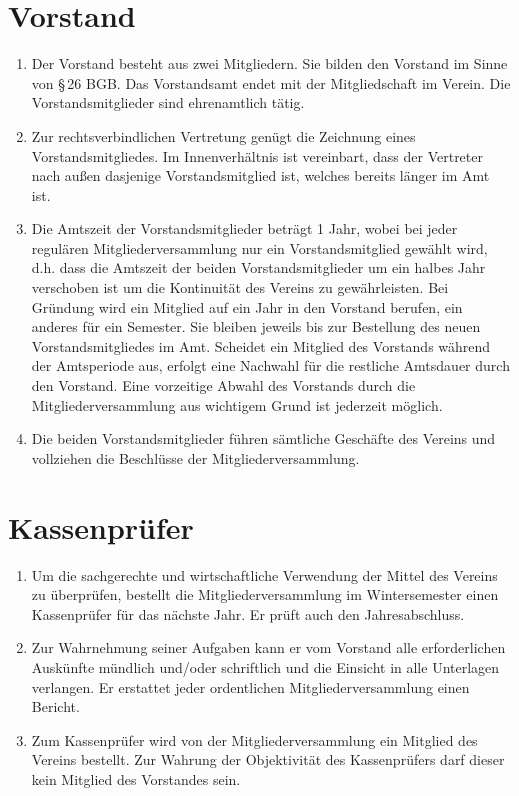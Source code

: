 \documentclass{article}
\begin{document}
\section{Vorstand}
\label{sec:vorstand}
\begin{enumerate}
	\item Der Vorstand besteht aus zwei Mitgliedern. Sie bilden den Vorstand im Sinne von \S\,26 BGB. Das Vorstandsamt endet mit der Mitgliedschaft im Verein. Die Vorstandsmitglieder sind ehrenamtlich tätig.
	\item Zur rechtsverbindlichen Vertretung genügt die Zeichnung eines Vorstandsmitgliedes. Im Innenverhältnis ist vereinbart, dass der Vertreter nach außen dasjenige Vorstandsmitglied ist, welches bereits länger im Amt ist.
	\item Die Amtszeit der Vorstandsmitglieder beträgt 1 Jahr, wobei bei jeder regulären Mitgliederversammlung nur ein Vorstandsmitglied gewählt wird, d.h. dass die Amtszeit der beiden Vorstandsmitglieder um ein halbes Jahr verschoben ist um die Kontinuität des Vereins zu gewährleisten. Bei Gründung wird ein Mitglied auf ein Jahr in den Vorstand berufen, ein anderes für ein Semester. Sie bleiben jeweils bis zur Bestellung des neuen Vorstandsmitgliedes im Amt. Scheidet ein Mitglied des Vorstands während der Amtsperiode aus, erfolgt eine Nachwahl für die restliche Amtsdauer durch den Vorstand. Eine vorzeitige Abwahl des Vorstands durch die Mitgliederversammlung aus wichtigem Grund ist jederzeit möglich.
	\item Die beiden Vorstandsmitglieder führen sämtliche Geschäfte des Vereins und vollziehen die Beschlüsse der Mitgliederversammlung.
\end{enumerate}

\section{Kassenprüfer}
\label{sec:kassenpruefer}
\begin{enumerate}
	\item Um die sachgerechte und wirtschaftliche Verwendung der Mittel des Vereins zu überprüfen, bestellt die Mitgliederversammlung im Wintersemester einen Kassenprüfer für das nächste Jahr. Er prüft auch den Jahresabschluss.
	\item Zur Wahrnehmung seiner Aufgaben kann er vom Vorstand alle erforderlichen Auskünfte mündlich und/oder schriftlich und die Einsicht in alle Unterlagen verlangen. Er erstattet jeder ordentlichen Mitgliederversammlung einen Bericht.
	\item Zum Kassenprüfer wird von der Mitgliederversammlung ein Mitglied des Vereins bestellt. Zur Wahrung der Objektivität des Kassenprüfers darf dieser kein Mitglied des Vorstandes sein.
\end{enumerate}
\end{document}
